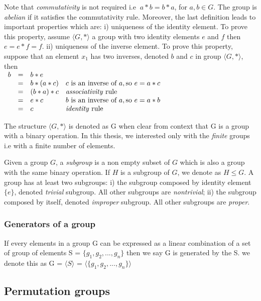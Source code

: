 Note that \emph{commutativity} is not required i.e $\ a * b = b * a$, for $a, b \in G$.
The group is \emph{abelian} if it satisfies the commutativity rule.
Moreover, the last definition leads to important properties which are: i) uniqueness of the identity element. 
To prove this property, assume $\langle G, * \rangle$ a group with two identity elements $e$ and $f$ 
then $ e = e * f = f$.
ii) uniqueness of the inverse element. To prove this property, suppose that an element $x_1$ has two inverses,
denoted $b$ and $c$ in group $\langle G, * \rangle$, then\\
 $\begin{array}{lcll}					
b & = & b * e & \\
& = & b * (a * c) & c \text{ is an inverse of } a, \text{so } e = a * c\\
& = & (b * a) * c &   \text{\emph{associativity} rule}\\
& = & e * c       & b \text{ is an inverse of } a, \text{so } e = a * b\\
& = & c           &   \text{\emph{identity} rule}
\end{array}$

The structure $\langle G, * \rangle$ is denoted as G when clear from context that G is a group
with a binary operation. In this thesis, we interested only with the \emph{finite} groups i.e
with a finite number of elements.

Given a group $G$, a \emph{subgroup} is a non empty subset of $G$ which is also a group with 
the same binary operation. If $H$ is a subgroup of $G$, we denote as $H \leq G$.
A group has at least two subgroups: i) the subgroup composed by identity element $\{e\}$, denoted \emph{trivial} subgroup.
All other subgroups are \emph{nontrivial}; ii) the subgroup composed by itself,
denoted \emph{improper} subgroup. All other subgroups are \emph{proper}.


\subsubsection{Generators of a group}

If every elements in a group G can be expressed as a linear combination
of a set of group of elements S = $\{g_1, g_2, ..., g_n \}$ then we say G is 
generated by the S. we denote this as G = $\langle S \rangle$ =
$\langle \{g_1, g_2, ..., g_n \} \rangle$ 



\subsection{Permutation groups}

